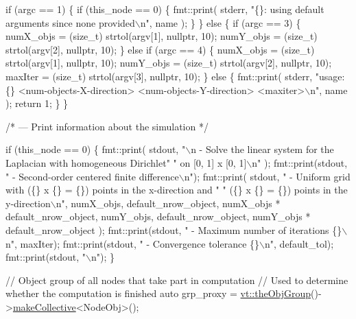 \begin{DoxyCodeInclude}
  \textcolor{keywordflow}{if} (argc == 1) \{
    \textcolor{keywordflow}{if} (this\_node == 0) \{
      fmt::print(
        stderr, \textcolor{stringliteral}{"\{\}: using default arguments since none provided\(\backslash\)n"}, name
      );
    \}
  \} \textcolor{keywordflow}{else} \{
    \textcolor{keywordflow}{if} (argc == 3) \{
      numX\_objs = (size\_t) strtol(argv[1], \textcolor{keyword}{nullptr}, 10);
      numY\_objs = (size\_t) strtol(argv[2], \textcolor{keyword}{nullptr}, 10);
    \}
    \textcolor{keywordflow}{else} \textcolor{keywordflow}{if} (argc == 4) \{
      numX\_objs = (size\_t) strtol(argv[1], \textcolor{keyword}{nullptr}, 10);
      numY\_objs = (size\_t) strtol(argv[2], \textcolor{keyword}{nullptr}, 10);
      maxIter = (size\_t) strtol(argv[3], \textcolor{keyword}{nullptr}, 10);
    \}
    \textcolor{keywordflow}{else} \{
      fmt::print(
        stderr, \textcolor{stringliteral}{"usage: \{\} <num-objects-X-direction> <num-objects-Y-direction> <maxiter>\(\backslash\)n"},
        name
      );
      \textcolor{keywordflow}{return} 1;
    \}
  \}

  \textcolor{comment}{/* --- Print information about the simulation */}

  \textcolor{keywordflow}{if} (this\_node == 0) \{
    fmt::print(
      stdout, \textcolor{stringliteral}{"\(\backslash\)n - Solve the linear system for the Laplacian with homogeneous Dirichlet"}
      \textcolor{stringliteral}{" on [0, 1] x [0, 1]\(\backslash\)n"}
    );
    fmt::print(stdout, \textcolor{stringliteral}{" - Second-order centered finite difference\(\backslash\)n"});
    fmt::print(
      stdout, \textcolor{stringliteral}{" - Uniform grid with (\{\} x \{\} = \{\}) points in the x-direction and "}
      \textcolor{stringliteral}{" (\{\} x \{\} = \{\}) points in the y-direction\(\backslash\)n"},
      numX\_objs, default\_nrow\_object, numX\_objs * default\_nrow\_object,
      numY\_objs, default\_nrow\_object, numY\_objs * default\_nrow\_object
    );
    fmt::print(stdout, \textcolor{stringliteral}{" - Maximum number of iterations \{\}\(\backslash\)n"}, maxIter);
    fmt::print(stdout, \textcolor{stringliteral}{" - Convergence tolerance \{\}\(\backslash\)n"}, default\_tol);
    fmt::print(stdout, \textcolor{stringliteral}{"\(\backslash\)n"});
  \}

  \textcolor{comment}{// Object group of all nodes that take part in computation}
  \textcolor{comment}{// Used to determine whether the computation is finished}
  \textcolor{keyword}{auto} grp\_proxy = \hyperlink{namespacevt_a833f0115b692f578167cbd88e30d39c5}{vt::theObjGroup}()->\hyperlink{structvt_1_1objgroup_1_1_obj_group_manager_a651c44a47c6bcdc9f1b6c9e857fa03f2}{makeCollective}<NodeObj>();


\end{DoxyCodeInclude}
